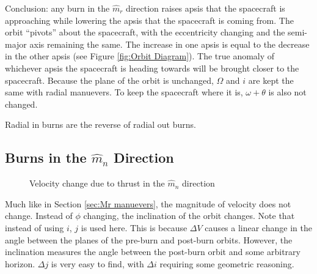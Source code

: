 \documentclass[../basicOrbitalDynamics.tex]{subfiles}
\begin{document}
Conclusion: any burn in the $\hat{m}_r$ direction raises apsis that the spacecraft is approaching while lowering the apsis that the spacecraft is coming from. The orbit ``pivots'' about the spacecraft, with the eccentricity changing and the semi-major axis remaining the same. The increase in one apsis is equal to the decrease in the other apsis (see Figure  \ref{fig:Orbit Diagram}). The true anomaly of whichever apsis the spacecraft is heading towards will be brought closer to the spacecraft. Because the plane of the orbit is unchanged, $\Omega$ and $i$ are kept the same with radial manuevers. To keep the spacecraft where it is, $\omega+\theta$ is also not changed.

Radial in burns are the reverse of radial out burns.

\bigskip\bigskip
\subsection{Burns in the \texorpdfstring{$\hat{m}_n$}{Normal} Direction}\label{sec:Mn Manuever}

\begin{figure}[H]
    \centering
    \caption{Velocity change due to thrust in the $\hat{m}_n$ direction}\label{fig:dV Triangle Mn}
\end{figure}

Much like in Section  \ref{sec:Mr manuevers}, the magnitude of velocity does not change. Instead of $\phi$ changing, the inclination of the orbit changes. Note that instead of using $i$, $j$ is used here. This is because $\Delta V$ causes a linear change in the angle between the planes of the pre-burn and post-burn orbits. However, the inclination measures the angle between the post-burn orbit and some arbitrary horizon. $\Delta j$ is very easy to find, with $\Delta i$ requiring some geometric reasoning.
\end{document}
